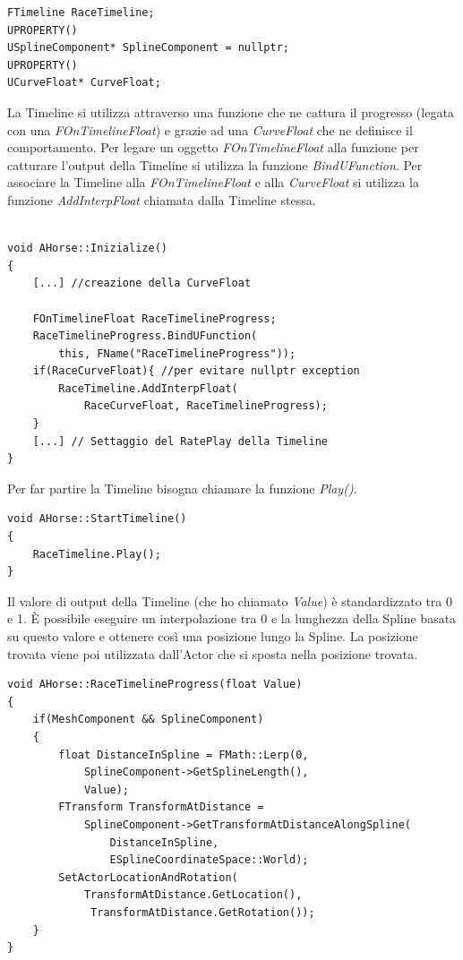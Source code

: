        \begin{lstlisting}[caption = Sezione del file header (movimento cavallo)]
FTimeline RaceTimeline;
UPROPERTY()
USplineComponent* SplineComponent = nullptr;
UPROPERTY()
UCurveFloat* CurveFloat;
        \end{lstlisting}

        La Timeline si utilizza attraverso una funzione che ne cattura il progresso (legata con una \textit{FOnTimelineFloat}) e grazie ad una \textit{CurveFloat} che ne definisce il comportamento. 
        Per legare un oggetto \textit{FOnTimelineFloat} alla funzione per catturare l'output della Timeline si utilizza la funzione \textit{BindUFunction}.
        Per associare la Timeline alla \textit{FOnTimelineFloat} e alla \textit{CurveFloat} si utilizza la funzione \textit{AddInterpFloat} chiamata dalla Timeline stessa.

        \begin{lstlisting}[caption = Inizializzazione della Timeline nel file source (movimento cavallo)]

void AHorse::Inizialize()
{
    [...] //creazione della CurveFloat

    FOnTimelineFloat RaceTimelineProgress;
    RaceTimelineProgress.BindUFunction(
        this, FName("RaceTimelineProgress"));
    if(RaceCurveFloat){ //per evitare nullptr exception
        RaceTimeline.AddInterpFloat(
            RaceCurveFloat, RaceTimelineProgress);
    }
    [...] // Settaggio del RatePlay della Timeline 
}

        \end{lstlisting}

        Per far partire la Timeline bisogna chiamare la funzione \textit{Play()}.

        \begin{lstlisting}
void AHorse::StartTimeline()
{
    RaceTimeline.Play();
}\end{lstlisting}

        Il valore di output della Timeline (che ho chiamato \textit{Value}) è standardizzato tra 0 e 1.
        È possibile eseguire un interpolazione tra 0 e la lunghezza della Spline basata su questo valore e ottenere così una posizione lungo la Spline.
        La posizione trovata viene poi utilizzata dall'Actor che si sposta nella posizione trovata.

        \begin{lstlisting}[caption = Funzione che sfrutta il valore restituito dalla timeline nel tempo  (movimento cavallo)]
void AHorse::RaceTimelineProgress(float Value)
{    
    if(MeshComponent && SplineComponent)
    {
        float DistanceInSpline = FMath::Lerp(0, 
            SplineComponent->GetSplineLength(), 
            Value);
        FTransform TransformAtDistance = 
            SplineComponent->GetTransformAtDistanceAlongSpline(
                DistanceInSpline, 
                ESplineCoordinateSpace::World);
        SetActorLocationAndRotation(
            TransformAtDistance.GetLocation(),
             TransformAtDistance.GetRotation());
    }
}
        \end{lstlisting}

